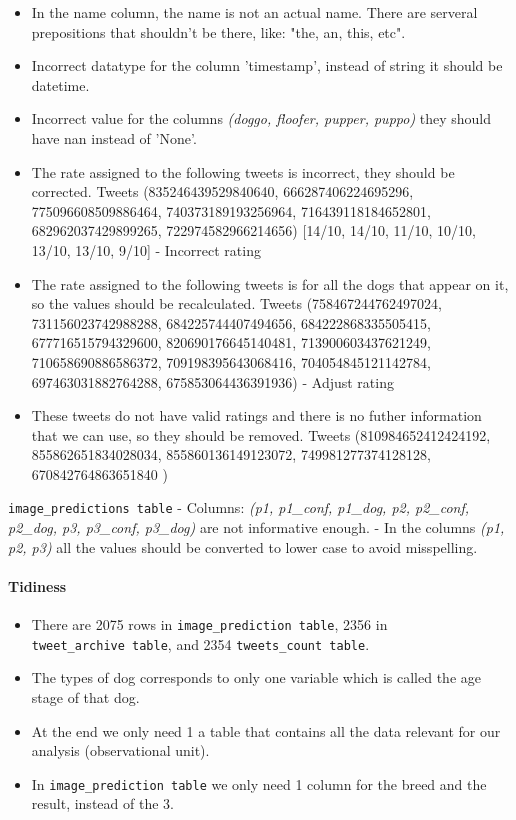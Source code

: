 \documentclass[11pt]{article}
\providecommand{\tightlist}{%
      \setlength{\itemsep}{0pt}\setlength{\parskip}{0pt}}
\begin{document}
\begin{itemize}
\tightlist
\item
  In the name column, the name is not an actual name. There are serveral
  prepositions that shouldn't be there, like: "the, an, this, etc".
\item
  Incorrect datatype for the column 'timestamp', instead of string it
  should be datetime.
\item
  Incorrect value for the columns \emph{(doggo, floofer, pupper, puppo)}
  they should have nan instead of 'None'.
\item
  The rate assigned to the following tweets is incorrect, they should be
  corrected. Tweets (835246439529840640, 666287406224695296,
  775096608509886464, 740373189193256964, 716439118184652801,
  682962037429899265, 722974582966214656) {[}14/10, 14/10, 11/10, 10/10,
  13/10, 13/10, 9/10{]} - Incorrect rating
\item
  The rate assigned to the following tweets is for all the dogs that
  appear on it, so the values should be recalculated. Tweets
  (758467244762497024, 731156023742988288, 684225744407494656,
  684222868335505415, 677716515794329600, 820690176645140481,
  713900603437621249, 710658690886586372, 709198395643068416,
  704054845121142784, 697463031882764288, 675853064436391936) - Adjust
  rating
\item
  These tweets do not have valid ratings and there is no futher
  information that we can use, so they should be removed. Tweets
  (810984652412424192, 855862651834028034, 855860136149123072,
  749981277374128128, 670842764863651840 )
\end{itemize}

\texttt{image\_predictions\ table} - Columns: \emph{(p1, p1\_conf,
p1\_dog, p2, p2\_conf, p2\_dog, p3, p3\_conf, p3\_dog)} are not
informative enough. - In the columns \emph{(p1, p2, p3)} all the values
should be converted to lower case to avoid misspelling.

\paragraph{Tidiness}\label{tidiness}

\begin{itemize}
\tightlist
\item
  There are 2075 rows in \texttt{image\_prediction\ table}, 2356 in
  \texttt{tweet\_archive\ table}, and 2354
  \texttt{tweets\_count\ table}.
\item
  The types of dog corresponds to only one variable which is called the
  age stage of that dog.
\item
  At the end we only need 1 a table that contains all the data relevant
  for our analysis (observational unit).
\item
  In \texttt{image\_prediction\ table} we only need 1 column for the
  breed and the result, instead of the 3.
\end{itemize}
\end{document}
